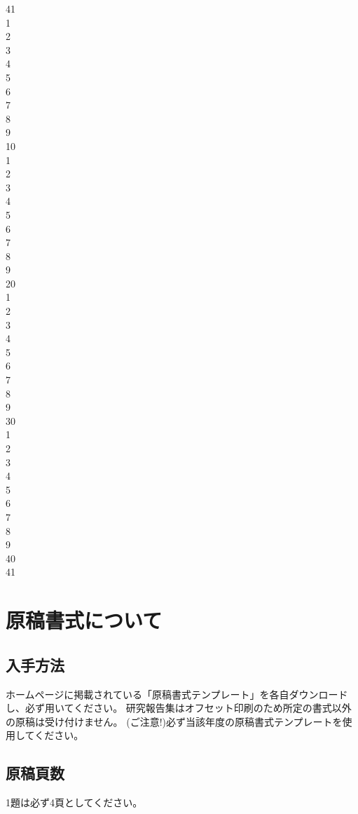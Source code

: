 \documentclass[base=11pt,magstyle=real,a4paper,twocolumn,xelatex,pandoc,jafont=ms]{bxjsarticle}
\begin{document}
41\\
1\\2\\3\\4\\5\\6\\7\\8\\9\\10\\
1\\2\\3\\4\\5\\6\\7\\8\\9\\20\\
1\\2\\3\\4\\5\\6\\7\\8\\9\\30\\
1\\2\\3\\4\\5\\6\\7\\8\\9\\40\\
41\\

\section{原稿書式について}

	\subsection{入手方法}
	ホームページに掲載されている「原稿書式テンプレート」を各自ダウンロードし、必ず用いてください。
	研究報告集はオフセット印刷のため所定の書式以外の原稿は受け付けません。
	(ご注意!)必ず当該年度の原稿書式テンプレートを使用してください。
	\subsection{原稿頁数}
	1題は必ず4頁としてください。
\end{document}
